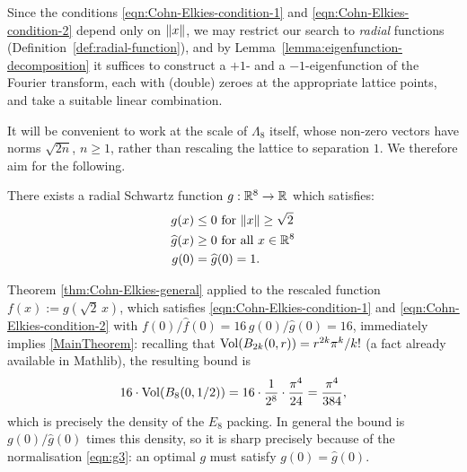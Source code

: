 Since the conditions \eqref{eqn:Cohn-Elkies-condition-1} and \eqref{eqn:Cohn-Elkies-condition-2} depend only on $\left\lVert x \right\rVert$, we may restrict our search to \emph{radial} functions (Definition~\ref{def:radial-function}), and by Lemma~\ref{lemma:eigenfunction-decomposition} it suffices to construct a $+1$- and a $-1$-eigenfunction of the Fourier transform, each with (double) zeroes at the appropriate lattice points, and take a suitable linear combination.

It will be convenient to work at the scale of $\Lambda_8$ itself, whose non-zero vectors have norms $\sqrt{2n}$, $n \geq 1$, rather than rescaling the lattice to separation $1$. We therefore aim for the following.

\begin{theorem}\label{thm:g}
There exists a radial Schwartz function $g:\mathbb{R}^8\to\mathbb{R}$ which satisfies:
\begin{align}
g(x)&\leq 0\mbox{ for } \|x\|\geq \sqrt{2} \label{eqn:g1}\\
\widehat{g}(x)&\geq0\mbox{ for all } x\in\mathbb{R}^8\label{eqn:g2}\\
g(0)&=\widehat{g}(0)=1.\label{eqn:g3}
\end{align}
\end{theorem}

Theorem \ref{thm:Cohn-Elkies-general} applied to the rescaled function $f(x):=g(\sqrt{2}\, x)$, which satisfies \eqref{eqn:Cohn-Elkies-condition-1} and \eqref{eqn:Cohn-Elkies-condition-2} with $f(0)/\widehat{f}(0) = 16\, g(0)/\widehat{g}(0) = 16$, immediately implies \cref{MainTheorem}: recalling that $\operatorname{Vol}\!\left(B_{2k}(0, r)\right) = r^{2k}\pi^k/k!$ (a fact already available in Mathlib), the resulting bound is
\[
  16 \cdot \operatorname{Vol}\!\left(B_8(0, 1/2)\right) = 16 \cdot \frac{1}{2^8}\cdot\frac{\pi^4}{24} = \frac{\pi^4}{384},
\]
which is precisely the density of the $E_8$ packing. In general the bound is $g(0)/\widehat{g}(0)$ times this density, so it is sharp precisely because of the normalisation \eqref{eqn:g3}: an optimal $g$ must satisfy $g(0) = \widehat{g}(0)$.
